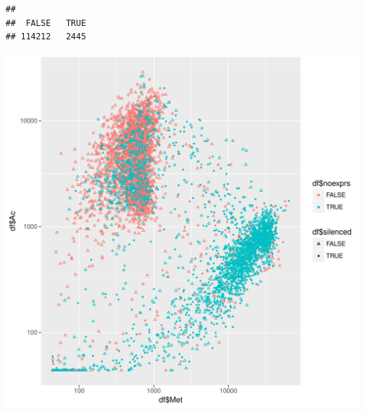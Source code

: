 \documentclass{article}\usepackage[]{graphicx}\usepackage[]{color}
\makeatletter
\newenvironment{kframe}{%
 \def\at@end@of@kframe{}%
 \ifinner\ifhmode%
  \def\at@end@of@kframe{\end{minipage}}%
  \begin{minipage}{\columnwidth}%
 \fi\fi%
 \def\FrameCommand##1{\hskip\@totalleftmargin \hskip-\fboxsep
 \colorbox{shadecolor}{##1}\hskip-\fboxsep
     \hskip-\linewidth \hskip-\@totalleftmargin \hskip\columnwidth}%
 \MakeFramed {\advance\hsize-\width
   \@totalleftmargin\z@ \linewidth\hsize
   \@setminipage}}%
 {\par\unskip\endMakeFramed%
 \at@end@of@kframe}
\newenvironment{knitrout}{}{} %
\makeatother
\begin{document}
\begin{knitrout}
\color{fgcolor}\begin{kframe}
\begin{verbatim}
## 
##  FALSE   TRUE 
## 114212   2445
\end{verbatim}
\end{kframe}
\includegraphics[width=1\linewidth]{figure/ac_met_log-1} 

\end{knitrout}
\end{document}
